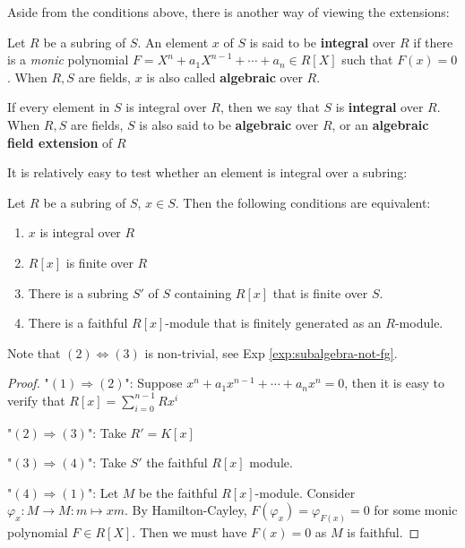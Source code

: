 \documentclass{note-eng}
\begin{document}
Aside from the conditions above, there is another way of viewing the extensions:

\begin{definition}
    Let $R$ be a subring of $S$. An element $x$ of $S$ is said to be \textbf{integral} over $R$ if there is a \textit{monic} polynomial $F = X^n + a_1X^{n - 1} + \cdots + a_n \in R[X]$ such that $F(x) = 0$. When $R, S$ are fields, $x$ is also called \textbf{algebraic} over $R$.
    
    If every element in $S$ is integral over $R$, then we say that $S$ is \textbf{integral} over $R$. When $R, S$ are fields, $S$ is also said to be \textbf{algebraic} over $R$, or an \textbf{algebraic field extension} of $R$
\end{definition}

It is relatively easy to test whether an element is integral over a subring:

\begin{proposition}\label{prop:integral-test}
    Let $R$ be a subring of $S$, $x \in S$. Then the following conditions are equivalent:
    \begin{enumerate}
        \item $x$ is integral over $R$
        \item $R[x]$ is finite over $R$
        \item There is a subring $S'$ of $S$ containing $R[x]$ that is finite over $S$.
        \item There is a faithful $R[x]$-module that is finitely generated as an $R$-module.
    \end{enumerate}
\end{proposition}

Note that $(2) \Leftrightarrow (3)$ is non-trivial, see Exp \ref{exp:subalgebra-not-fg}.

\begin{proof}
    "$(1) \Rightarrow (2)$": Suppose $x^n + a_1x^{n - 1} + \cdots + a_nx^n = 0$, then it is easy to verify that $R[x] = \sum\limits_{i = 0}^{n - 1} Rx^i$

    "$(2) \Rightarrow (3)$": Take $R' = K[x]$

    "$(3) \Rightarrow (4)$": Take $S'$ the faithful $R[x]$ module.

    "$(4) \Rightarrow (1)$": Let $M$ be the faithful $R[x]$-module. Consider $\varphi_x: M \rightarrow M: m \mapsto xm$. By Hamilton-Cayley, $F(\varphi_x) = \varphi_{F(x)} = 0$ for some monic polynomial $F \in R[X]$. Then we must have $F(x) = 0$ as $M$ is faithful.
\end{proof}
\end{document}
